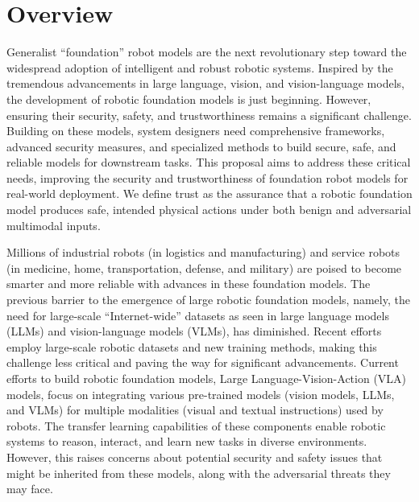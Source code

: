 \section{Overview}

Generalist ``foundation'' robot models are the next revolutionary step toward the widespread adoption of intelligent and robust robotic systems. 
Inspired by the tremendous advancements in large language, vision, and vision-language models, the development of robotic foundation models is just beginning. 
However, ensuring their security, safety, and trustworthiness remains a significant challenge. Building on these models, system designers need comprehensive frameworks, advanced security measures, and specialized methods to build secure, safe, and reliable models for downstream tasks. This proposal aims to address these critical needs, improving the security and trustworthiness of foundation robot models for real-world deployment. We define trust as the assurance that a robotic foundation model produces safe, intended physical actions under both benign and adversarial multimodal inputs.

Millions of industrial robots (\eg in logistics and manufacturing) and service robots (\eg in medicine, home, transportation, defense, and military) are poised to become smarter and more reliable with advances in these foundation models. The previous barrier to the emergence of large robotic foundation models, namely, the need for large-scale ``Internet-wide'' datasets as seen in large language models (LLMs) and vision-language models (VLMs), has diminished. Recent efforts employ large-scale \xot robotic datasets and new training methods, making this challenge less critical and paving the way for significant advancements.
Current efforts to build robotic foundation models, \eg Large Language-Vision-Action (VLA) models, focus on integrating various pre-trained models (\eg vision models, LLMs, and VLMs) for multiple modalities (\eg visual and textual instructions) used by robots. 
The transfer learning capabilities of these components enable robotic systems to reason, interact, and learn new tasks in diverse environments. However, this raises concerns about potential security and safety issues that might be inherited from these models, along with the adversarial threats they may face.

\vspace{-2ex}
\vspace{-3ex}

